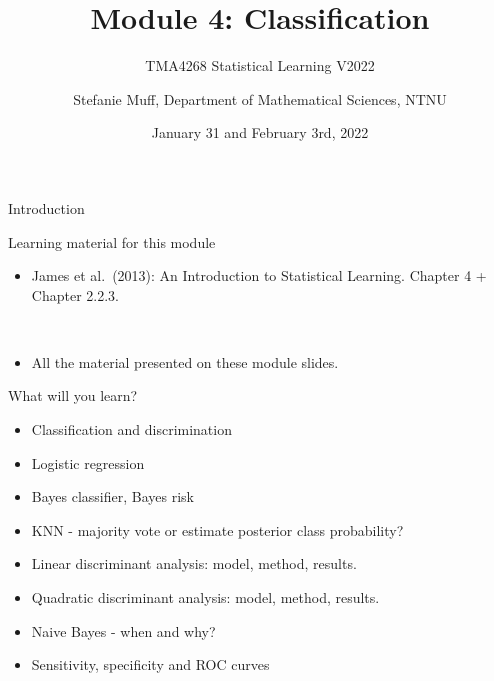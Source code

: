 \documentclass[
  10pt,
  ignorenonframetext,
]{beamer}
\title{Module 4: Classification}
\subtitle{TMA4268 Statistical Learning V2022}
\author{Stefanie Muff, Department of Mathematical Sciences, NTNU}
\date{January 31 and February 3rd, 2022}
\providecommand{\tightlist}{%
  \setlength{\itemsep}{0pt}\setlength{\parskip}{0pt}}
\begin{document}
\frame{\titlepage}

\begin{frame}
\end{frame}

\begin{frame}{Introduction}
\protect\hypertarget{introduction}{}
\begin{block}{Learning material for this module}
\protect\hypertarget{learning-material-for-this-module}{}
\vspace{2mm}

\begin{itemize}
\tightlist
\item
  James et al.~(2013): An Introduction to Statistical Learning. Chapter
  4 + Chapter 2.2.3.
\end{itemize}

\(~\)

\begin{itemize}
\tightlist
\item
  All the material presented on these module slides.
\end{itemize}
\end{block}
\end{frame}

\begin{frame}
\begin{block}{What will you learn?}
\protect\hypertarget{what-will-you-learn}{}
\(~\)

\begin{itemize}
\item
  Classification and discrimination
\item
  Logistic regression
\item
  Bayes classifier, Bayes risk
\item
  KNN - majority vote or estimate posterior class probability?
\item
  Linear discriminant analysis: model, method, results.
\item
  Quadratic discriminant analysis: model, method, results.
\item
  Naive Bayes - when and why?
\item
  Sensitivity, specificity and ROC curves
\end{itemize}
\end{block}
\end{frame}
\end{document}
